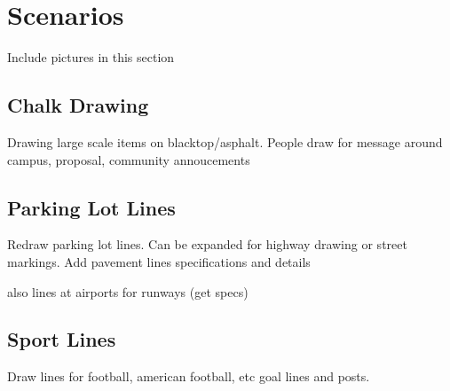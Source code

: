 
\section{Scenarios}
\label{sec:scenarios}
Include pictures in this section

\subsection{Chalk Drawing}
Drawing large scale items on blacktop/asphalt. People draw for message around campus, proposal, community annoucements

\subsection{Parking Lot Lines}
Redraw parking lot lines. Can be expanded for highway drawing or street markings. Add pavement lines specifications and details

also lines at airports for runways (get specs)

\subsection{Sport Lines}
Draw lines for football, american football, etc goal lines and posts. 
